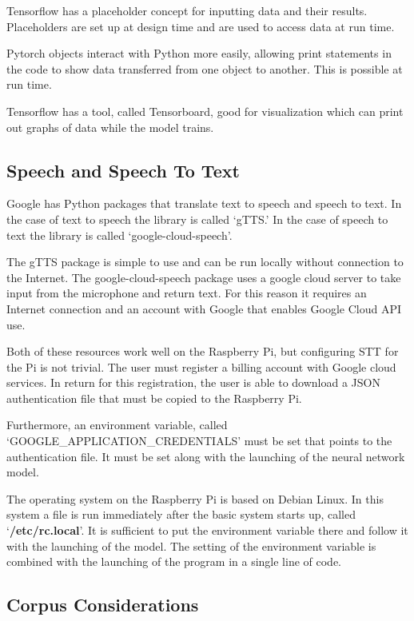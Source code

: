 Tensorflow has a placeholder concept for inputting data and their results. Placeholders are set up at design time and are used to access data at run time.

Pytorch objects interact with Python more easily, allowing print statements in the code to show data transferred from one object to another. This is possible at run time.

Tensorflow has a tool, called Tensorboard, good for visualization which can print out graphs of data while the model trains. 

\subsection{Speech and Speech To Text}
\label{speech-and-speech-to-text}

Google has Python packages that translate text to speech and speech to text. In the case of text to speech the library is called `\ac{gTTS}.' In the case of speech to text the library is called `google-cloud-speech'. 

The gTTS package is simple to use and can be run locally without connection to the Internet. The google-cloud-speech package uses a google cloud server to take input from the microphone and return text. For this reason it requires an Internet connection and an account with Google that enables Google Cloud API use. %

Both of these resources work well on the Raspberry Pi, but configuring STT for the Pi is not trivial. The user must register a billing account with Google cloud services. In return for this registration, the user is able to download a JSON authentication file that must be copied to the Raspberry Pi. 

Furthermore, an environment variable, called `GOOGLE\_APPLICATION\_CREDENTIALS' must be set that points to the authentication file. It must be set along with the launching of the neural network model.

The operating system on the Raspberry Pi is based on Debian Linux. In this system a file is run immediately after the basic system starts up, called `\textbf{/etc/rc.local}'. It is sufficient to put the environment variable there and follow it with the launching of the model. The setting of the environment variable is combined with the launching of the program in a single line of code.


\subsection{Corpus Considerations}

